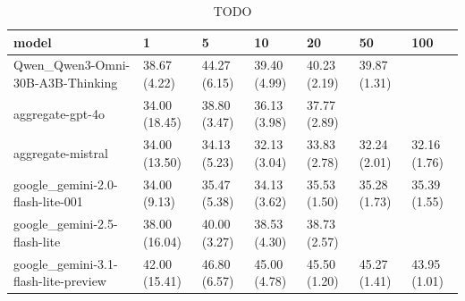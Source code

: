 \begin{table}[htbp]
  \centering
  \begin{tabular}{lllllll}
    \toprule
    model & 1 & 5 & 10 & 20 & 50 & 100 \\
    \midrule
    Qwen_Qwen3-Omni-30B-A3B-Thinking & 38.67 (4.22) & 44.27 (6.15) & 39.40 (4.99) & 40.23 (2.19) & 39.87 (1.31) &  \\
    aggregate-gpt-4o & 34.00 (18.45) & 38.80 (3.47) & 36.13 (3.98) & 37.77 (2.89) &  &  \\
    aggregate-mistral & 34.00 (13.50) & 34.13 (5.23) & 32.13 (3.04) & 33.83 (2.78) & 32.24 (2.01) & 32.16 (1.76) \\
    google_gemini-2.0-flash-lite-001 & 34.00 (9.13) & 35.47 (5.38) & 34.13 (3.62) & 35.53 (1.50) & 35.28 (1.73) & 35.39 (1.55) \\
    google_gemini-2.5-flash-lite & 38.00 (16.04) & 40.00 (3.27) & 38.53 (4.30) & 38.73 (2.57) &  &  \\
    google_gemini-3.1-flash-lite-preview & 42.00 (15.41) & 46.80 (6.57) & 45.00 (4.78) & 45.50 (1.20) & 45.27 (1.41) & 43.95 (1.01) \\
    \bottomrule
  \end{tabular}
  \caption{TODO}
  \label{tab:TODO}
\end{table}
